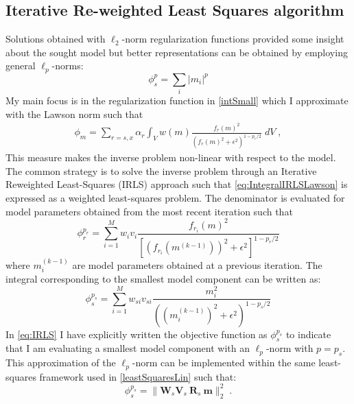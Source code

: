 \subsection{Iterative Re-weighted Least Squares algorithm}
Solutions obtained with $\ell_2$-norm regularization functions provided some insight about the sought model but better representations can be obtained by employing general $\ell_p$-norms:
\begin{equation} \label{eq:lpreg}
\phi_s^{p} = \sum_{i} {|m_i|}^{p}
\end{equation}
My main focus is in the regularization function in \eqref{intSmall} which I approximate with the Lawson norm such that
\begin{equation}\label{eq:IntegralIRLSLawson}
\begin{split}
	\phi_m = \sum_{r=s,x} \alpha_r \int_V{w(m) \frac{{f_r (m)}^2}{\left( {{f_r (m)}}^{2} + \epsilon^2 \right)^{1-p_r/2 }}\;dV} \;,	
\end{split}
\end{equation}
This measure makes the inverse problem non-linear with respect to the model. The common strategy is to solve the inverse problem through an Iterative Reweighted Least-Squares (IRLS) approach such that \eqref{eq:IntegralIRLSLawson} is expressed as a weighted least-squares problem. The denominator is evaluated for model parameters obtained from the most recent iteration such that
\begin{equation} \label{eq:IRLS_fm}
\phi_r^{p_r} = \sum_{i=1}^M w_{i}v_{i}\frac{f_{r_i}(m)^2}{{{\left[(f_{r_i}(m^{(k-1)}))^{2} + \epsilon^2 \right]}^{1-p_r/2}} }
\end{equation}
where $m_i^{(k-1)}$ are model parameters obtained at a previous iteration. 
The integral corresponding to the smallest model component can be written as:
\begin{equation} \label{eq:IRLS}
\phi_s^{p_s} = \sum_{i=1}^M w_{si}v_{si}\frac{m_i^2}{{{((m^{(k-1)}_i)^{2} + \epsilon^2 )}^{1-p_s/2}} }
\end{equation}
In \eqref{eq:IRLS} I have explicitly written the objective function as $\phi_s^{p_s}$ to indicate that I am evaluating a smallest model component with an $\ell_p$-norm with
$p=p_s$.
This approximation of the $\ell_p$-norm can be implemented within the same least-squares framework used in \eqref{leastSquaresLin} such that:
\begin{equation}\label{IRLSphis}
\phi_s^{p_s} = \|\mathbf{W}_s \mathbf{V}_s\:\mathbf{R}_s\:\mathbf{m}\|_2^2 \;.
\end{equation}

